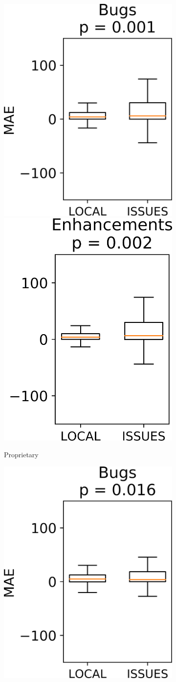 \begin{figure}[tb!]
	\centering
	\begin{subfigure}[t]{0.49\linewidth}
		\centering
		\includegraphics[width=0.5\linewidth]{images/RQ4/inhouse/Bugs.png}		
		\includegraphics[width=0.475\linewidth]{images/RQ4/inhouse/Enhancements.png}
		\caption{Proprietary}
	\end{subfigure}%
		\begin{subfigure}[t]{0.49\linewidth}
		\centering
		\includegraphics[width=0.5\linewidth]{images/RQ4/opensrc/Bugs.png}		

\end{subfigure}
\end{figure}
